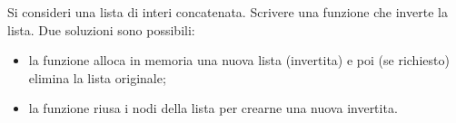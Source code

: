 \begin{Exercise}[label={ex:inverti}]
    Si consideri una lista di interi concatenata.
    Scrivere una funzione che inverte la lista. Due soluzioni sono possibili:
    \begin{itemize}
        \item la funzione alloca in memoria una nuova lista (invertita) e poi (se richiesto) elimina
        la lista originale;
        \item la funzione riusa i nodi della lista per crearne una nuova invertita.
    \end{itemize}
\end{Exercise}

\begin{Answer}[ref={ex:inverti}]
  	
\end{Answer}